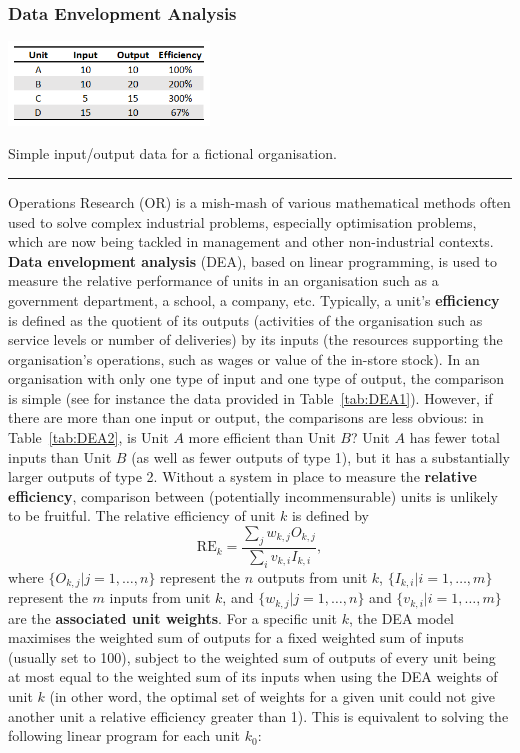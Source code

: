 \subsubsection{Data Envelopment Analysis}
\begin{table}
  \begin{center}
    \includegraphics[width=0.4\textwidth]{images/OPT/DEA1}
  \end{center}
  \caption{\small Simple input/output data for a fictional organisation.}\hrule
  \label{tab:DEA1}
\end{table}
Operations Research (OR) is a mish-mash of various mathematical methods often used to solve complex industrial problems, especially optimisation problems, which are now being tackled in management and other non-industrial contexts. \textbf{Data envelopment analysis} (DEA), based on linear programming, is used to measure the relative performance of units in an organisation such as a government department, a school, a company, etc. \newl Typically, a unit's \textbf{efficiency} is defined as the quotient  of its outputs (activities of the organisation such as service levels or number of deliveries) by its inputs (the resources supporting the organisation's operations, such as wages or value of the in-store stock). In an organisation with only one type of input and one type of output, the comparison is simple (see for instance the data provided in Table~\ref{tab:DEA1}). 
However, if there are more than one input or output, the comparisons are less obvious: in Table~\ref{tab:DEA2}, is Unit $A$ more efficient than Unit $B$? Unit $A$ has fewer total inputs than Unit $B$ (as well as fewer outputs of type 1), but it has a substantially larger outputs of type 2. Without a system in place to measure the \textbf{relative efficiency}, comparison between (potentially incommensurable) units is unlikely to be fruitful. The relative efficiency of unit $k$ is defined by $$\mbox{RE}_k = \frac{\sum_j w_{k,j}O_{k,j}}{\sum_i v_{k,i}I_{k,i}}, $$ where $\{O_{k,j}|j=1,\ldots,n\}$ represent the $n$ outputs from unit $k$, $\{I_{k,i}|i=1,\ldots,m\}$ represent the $m$ inputs from unit $k$, and $\{w_{k,j}|j=1,\ldots,n\}$ and $\{v_{k,i}|i=1,\ldots, m\}$ are the \textbf{associated unit weights}. \newl For a specific unit $k$, the DEA model maximises the weighted sum of outputs for a fixed weighted sum of inputs (usually set to 100), subject to the weighted sum of outputs of every unit being at most equal to the weighted sum of its inputs when using the DEA weights of unit $k$ (in other word, the optimal set of weights for a given unit could not give another unit a relative efficiency greater than 1). This is equivalent to solving the following linear program for each unit $k_0$:   

